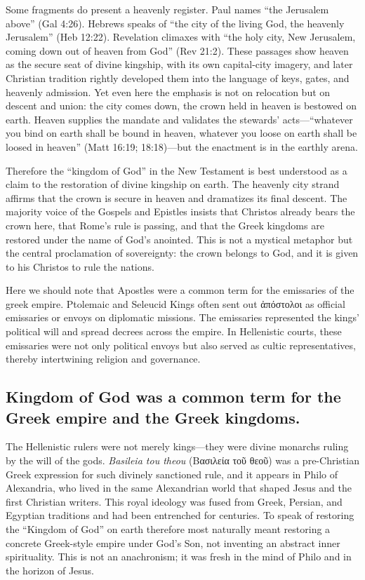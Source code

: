 Some fragments do present a heavenly register.
Paul names “the Jerusalem above” (Gal 4:26).
Hebrews speaks of “the city of the living God, the heavenly Jerusalem” (Heb 12:22).
Revelation climaxes with “the holy city, New Jerusalem, coming down out of heaven from God” (Rev 21:2).
These passages show heaven as the secure seat of divine kingship, with its own capital-city imagery, and later Christian tradition rightly developed them into the language of keys, gates, and heavenly admission.
Yet even here the emphasis is not on relocation but on descent and union: the city comes down, the crown held in heaven is bestowed on earth.
Heaven supplies the mandate and validates the stewards’ acts—“whatever you bind on earth shall be bound in heaven, whatever you loose on earth shall be loosed in heaven” (Matt 16:19; 18:18)—but the enactment is in the earthly arena.

Therefore the “kingdom of God” in the New Testament is best understood as a claim to the restoration of divine kingship on earth.
The heavenly city strand affirms that the crown is secure in heaven and dramatizes its final descent.
The majority voice of the Gospels and Epistles insists that Christos already bears the crown here, that Rome’s rule is passing, and that the Greek kingdoms are restored under the name of God’s anointed.
This is not a mystical metaphor but the central proclamation of sovereignty: the crown belongs to God, and it is given to his Christos to rule the nations.

Here we should note that Apostles were a common term for the emissaries of the greek empire.
Ptolemaic and Seleucid Kings often sent out ἀπόστολοι as official emissaries or envoys on diplomatic missions.
The emissaries represented the kings’ political will and spread decrees across the empire.
In Hellenistic courts, these emissaries were not only political envoys but also served as cultic representatives, thereby intertwining religion and governance.

\subsection{Kingdom of God was a common term for the Greek empire and the Greek kingdoms.}\label{subsec:kingdom-of-god-was-a-common-term-for-the-greek-empire-and-the-greek-kingdoms.}

The Hellenistic rulers were not merely kings---they were divine monarchs ruling by the will of the gods.
\emph{Basileia tou theou} (Βασιλεία τοῦ θεοῦ) was a pre-Christian Greek expression for such divinely sanctioned rule, and it appears in Philo of Alexandria, who lived in the same Alexandrian world that shaped Jesus and the first Christian writers.
This royal ideology was fused from Greek, Persian, and Egyptian traditions and had been entrenched for centuries.
To speak of restoring the ``Kingdom of God'' on earth therefore most naturally meant restoring a concrete Greek-style empire under God’s Son, not inventing an abstract inner spirituality.
This is not an anachronism; it was fresh in the mind of Philo and in the horizon of Jesus.


